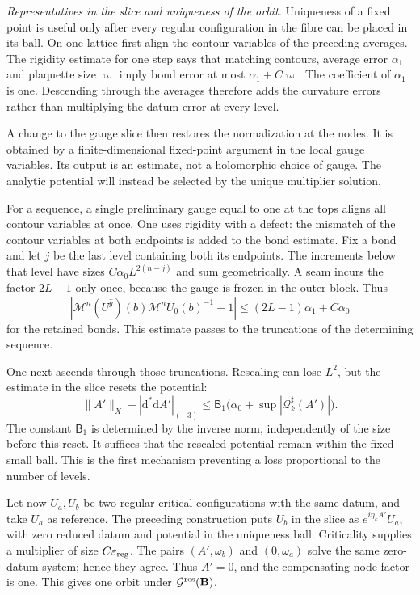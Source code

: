 \documentclass[11pt,letterpaper,reqno]{amsart}
\theoremstyle{definition}
\theoremstyle{remark}
\begin{document}
\emph{Representatives in the slice and uniqueness of the orbit.}
Uniqueness of a fixed point is useful only after every
regular configuration in the fibre can be placed in its
ball. On one lattice first align the contour variables
of the preceding averages. The rigidity estimate for
one step says that matching contours, average error
$\alpha_1$ and plaquette size $\varpi$ imply bond error
at most $\alpha_1+C\varpi$. The coefficient of
$\alpha_1$ is one. Descending through the averages
therefore adds the curvature errors rather than
multiplying the datum error at every level.

A change to the gauge slice then restores the
normalization at the nodes. It is obtained by a
finite-dimensional fixed-point argument in the local
gauge variables. Its output is an estimate, not a
holomorphic choice of gauge. The analytic potential
will instead be selected by the unique multiplier
solution.

For a sequence, a single preliminary gauge equal to
one at the tops aligns all contour variables at once.
One uses rigidity with a defect: the mismatch of
the contour variables at both endpoints is added
to the bond estimate. Fix a bond and let $j$ be
the last level containing both its endpoints.
The increments below that level have sizes
$C\alpha_0L^{2(n-j)}$ and sum geometrically. A
seam incurs the factor $2L-1$ only once, because
the gauge is frozen in the outer block. Thus
\[
 |\mathcal M^n(U^{\hat g})(b)
                       \mathcal M^nU_0(b)^{-1}-1|
                 \le(2L-1)\alpha_1+C\alpha_0
\]
for the retained bonds. This estimate passes to
the truncations of the determining sequence.

One next ascends through those truncations.
Rescaling can lose $L^2$, but the estimate in
the slice resets the potential:
\[
 \|A'\|_X+|\mathrm d^*\mathrm d A'|_{(-3)}
            \le\mathsf B_1\big(\alpha_0+
                                \sup|\mathcal Q_k^\sharp(A')|\big).
\]
The constant $\mathsf B_1$ is determined by the
inverse norm, independently of the size before
this reset. It suffices that the rescaled
potential remain within the fixed small ball.
This is the first mechanism preventing a loss
proportional to the number of levels.

Let now $U_a,U_b$ be two regular critical
configurations with the same datum, and take
$U_a$ as reference. The preceding construction
puts $U_b$ in the slice as $e^{i\eta_kA'}U_a$,
with zero reduced datum and potential in the
uniqueness ball. Criticality supplies a
multiplier of size $C\varepsilon_{\rm reg}$.
The pairs $(A',\omega_b)$ and $(0,\omega_a)$
solve the same zero-datum system; hence they
agree. Thus $A'=0$, and the compensating node
factor is one. This gives one orbit under
$\mathcal G^{\rm res}(\mathbf B)$.
\end{document}
